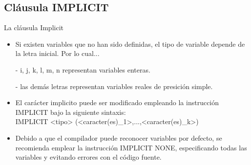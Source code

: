 
\subsection{Cláusula IMPLICIT}

\begin{frame}[fragile]{La cláusula Implicit}
 \begin{itemize}[<+(0)->]
  \item Si existen variables que no han sido definidas, el tipo de variable depende de la letra inicial. Por lo cual...
  \item[-] i, j, k, l, m, n representan variables enteras.
  \item[-] las demás letras representan variables reales de presición simple.
  \item El carácter implicito puede ser modificado empleando la instrucción IMPLICIT bajo la siguiente sintaxis:\\
  \centering IMPLICIT <tipo> (<caracter(es)\_1>,...,<caracter(es)\_k>)
  \item Debido a que el compilador puede reconocer variables por defecto, se recomienda emplear la instrucción IMPLICIT NONE, especificando todas las variables y evitando errores con el código fuente.
 \end{itemize}
\end{frame}
